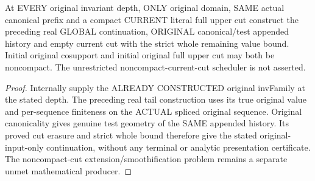 \begin{theorem}
\label{hir:original-all-depth-current-compact-cut-global-continuation}
\leanok
At EVERY original invariant depth, ONLY original domain, SAME actual
canonical prefix and a compact CURRENT literal full upper cut construct
the preceding real GLOBAL continuation, ORIGINAL canonical/test appended
history and empty current cut with the strict whole remaining value bound.
Initial original cosupport and initial original full upper cut may both be
noncompact. The unrestricted noncompact-current-cut scheduler is not asserted.
\end{theorem}
\begin{proof}
Internally supply the ALREADY CONSTRUCTED original invFamily at the stated
depth. The preceding real tail construction uses its true original value
and per-sequence finiteness on the ACTUAL spliced original sequence.
Original canonicality gives genuine test geometry of the SAME appended
history. Its proved cut erasure and strict whole bound therefore give the
stated original-input-only continuation, without any terminal or analytic
presentation certificate. The noncompact-cut extension/smoothification
problem remains a separate unmet mathematical producer.
\end{proof}
